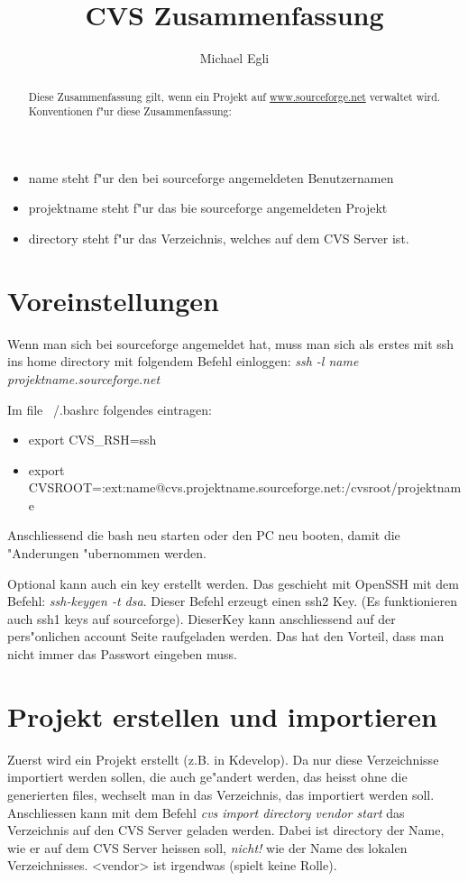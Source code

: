 \documentclass[a4paper]{article}
\begin{document}
\title{CVS Zusammenfassung}
\author{Michael Egli}
\date{}
\maketitle

\begin{abstract}
Diese Zusammenfassung gilt, wenn ein Projekt auf \href{www.sourceforge.net}{www.sourceforge.net} verwaltet wird.
Konventionen f"ur diese Zusammenfassung:
\end{abstract}

\begin{itemize}
\item name steht f"ur den bei sourceforge angemeldeten Benutzernamen
\item projektname steht f"ur das bie sourceforge angemeldeten Projekt
\item directory steht f"ur das Verzeichnis, welches auf dem CVS Server ist.
\end{itemize}

\section{Voreinstellungen}
Wenn man sich bei sourceforge angemeldet hat, muss man sich als erstes mit ssh ins home directory
mit folgendem Befehl einloggen: \textit{ssh -l name projektname.sourceforge.net}

Im file ~/.bashrc folgendes eintragen:
\begin{itemize}
\item export CVS\_RSH=ssh
\item export CVSROOT=:ext:name@cvs.projektname.sourceforge.net:/cvsroot/projektname
\end{itemize}
Anschliessend die bash neu starten oder den PC neu booten, damit die "Anderungen "ubernommen werden.

Optional kann auch ein key erstellt werden. Das geschieht mit OpenSSH mit dem Befehl: \textit{ssh-keygen -t dsa}. Dieser Befehl
erzeugt einen ssh2 Key. (Es funktionieren auch ssh1 keys auf sourceforge).
DieserKey kann anschliessend auf der pers"onlichen account Seite raufgeladen werden. Das hat den Vorteil, dass man nicht immer
das Passwort eingeben muss.

\section{Projekt erstellen und importieren}
Zuerst wird ein Projekt erstellt (z.B. in Kdevelop). Da nur diese Verzeichnisse importiert werden sollen, die auch ge"andert werden,
das heisst ohne die generierten files, wechselt man in das Verzeichnis, das importiert werden soll.
Anschliessen kann mit dem Befehl \textit{cvs import directory vendor start} das Verzeichnis auf den CVS Server geladen werden. Dabei
ist directory der Name, wie er auf dem CVS Server heissen soll, \textit{nicht!} wie der Name des lokalen Verzeichnisses. <vendor>
ist irgendwas (spielt keine Rolle).
\end{document}
